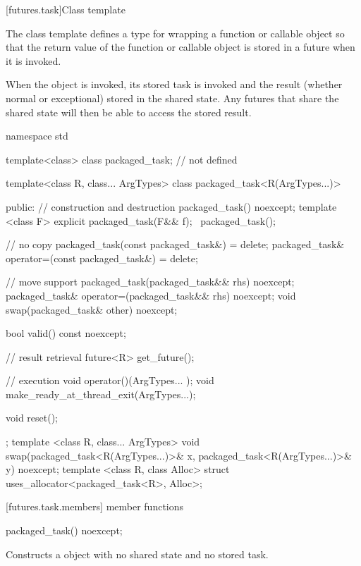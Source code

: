 [futures.task]{Class template }

\pnum
The class template  defines a type for wrapping a function or
callable object so that the return value of the function or callable object is stored in
a future when it is invoked.

\pnum
When the  object is invoked, its stored task is invoked and the
result (whether normal or exceptional) stored in the shared state. Any futures that
share the shared state will then be able to access the stored result.

%
\begin{codeblock}
namespace std {
  template<class> class packaged_task; // not defined

  template<class R, class... ArgTypes>
  class packaged_task<R(ArgTypes...)> {
  public:
    // construction and destruction
    packaged_task() noexcept;
    template <class F>
      explicit packaged_task(F&& f);
    ~packaged_task();

    // no copy
    packaged_task(const packaged_task&) = delete;
    packaged_task& operator=(const packaged_task&) = delete;

    // move support
    packaged_task(packaged_task&& rhs) noexcept;
    packaged_task& operator=(packaged_task&& rhs) noexcept;
    void swap(packaged_task& other) noexcept;

    bool valid() const noexcept;

    // result retrieval
    future<R> get_future();

    // execution
    void operator()(ArgTypes... );
    void make_ready_at_thread_exit(ArgTypes...);

    void reset();
  };
  template <class R, class... ArgTypes>
    void swap(packaged_task<R(ArgTypes...)>& x, packaged_task<R(ArgTypes...)>& y) noexcept;
  template <class R, class Alloc>
    struct uses_allocator<packaged_task<R>, Alloc>;
}
\end{codeblock}

[futures.task.members]{ member functions}

%
\begin{itemdecl}
packaged_task() noexcept;
\end{itemdecl}

\begin{itemdescr}
\pnum
\effects Constructs a  object with no shared state and no stored task.
\end{itemdescr}

